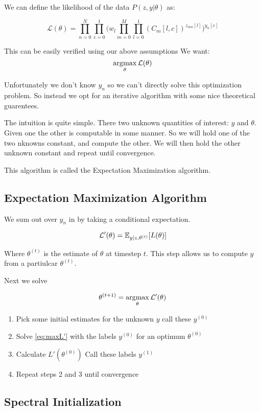 We can define the likelihood of the data $P(z,y| \theta)$ as:

\begin{equation}  \label{eq:L}
\mathcal{L}(\theta) =
\displaystyle\prod\limits_{n=0}^{N} \displaystyle\prod\limits_{c=0}^{1}
\Big (w_{l} \displaystyle\prod\limits_{m=0}^{M} \displaystyle\prod\limits_{l=0}^{1} (C_{m}[l,c])^{z_{mn}[l]} \Big )^{y_{n}[c]}
\end{equation}

This can be easily verified using our above assumptions
We want: \\

\begin{equation} \label{eq:maxL}
\operatorname*{arg\!\max}_{\theta} \mathcal{L}(\theta)
\end{equation}

Unfortunately we don't know $y_{n}$ so we can't directly solve this optimization problem.
So instead we opt for an iterative algorithm with some nice theoretical guarentees. 


The intuition is quite simple. There two unknown quantities of interest: $y$ and $\theta$.
Given one the other is computable in some manner. So we will hold one of the two nknowns constant,
and compute the other. We will then hold the other unknown constant and repeat until convergence.

This algorithm is called the Expectation Maximization algorithm.




\subsection{Expectation Maximization Algorithm}

We sum out over $y_{n}$ in \label{eq:L} by taking a
conditional expectation.

\begin{equation} \label{eq:L'}
    \mathcal{L'}(\theta) = \mathbb{E}_{y | z, \theta^{(t)}}[L(\theta)]
\end{equation}

Where $\theta^{(t)}$ is the estimate of $\theta$ at timestep $t$. This step allows us to compute $y$ from a partiulcar 
$\theta^{(t)}$.

Next we solve

\begin{equation} \label{eq:maxL'}
    \theta^{(t+1)} = \operatorname*{arg\!\max}_{\theta} \mathcal{L'}(\theta)
\end{equation}


\begin{enumerate}
    \item Pick some initial estimates for the unknown $y$ call these $y^{(0)}$
    \item Solve \eqref{eq:maxL'} with the labels $y^{(0)}$ for an optimum $\theta^{(0)}$
    \item Calculate $L'(\theta^{(0)})$ Call these labels $y^{(1)}$
    \item Repeat steps 2 and 3 until convergence
\end{enumerate}


\subsection{Spectral Initialization}
